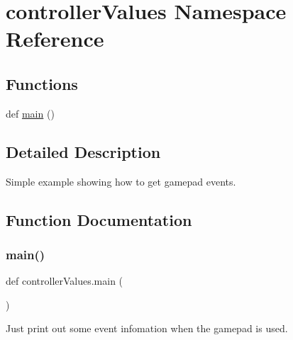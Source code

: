 \hypertarget{namespacecontrollerValues}{}\section{controller\+Values Namespace Reference}
\label{namespacecontrollerValues}
\subsection*{Functions}
\begin{DoxyCompactItemize}
\item 
def \hyperlink{namespacecontrollerValues_a18f3acd9e92dff4ed473f83aaa9bf6a1}{main} ()
\end{DoxyCompactItemize}


\subsection{Detailed Description}
\begin{DoxyVerb}Simple example showing how to get gamepad events.\end{DoxyVerb}
 

\subsection{Function Documentation}
\mbox{\label{namespacecontrollerValues_a18f3acd9e92dff4ed473f83aaa9bf6a1}} 
\subsubsection{\texorpdfstring{main()}{main()}}
{\footnotesize\ttfamily def controller\+Values.\+main (\begin{DoxyParamCaption}{ }\end{DoxyParamCaption})}

\begin{DoxyVerb}Just print out some event infomation when the gamepad is used.\end{DoxyVerb}
 